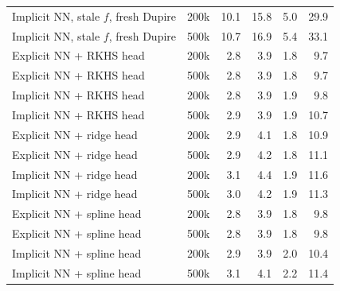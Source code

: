 \begin{tabular}{l l rrrr}
Implicit NN, stale $f$, fresh Dupire & 200k & 10.1 & 15.8 & 5.0 & 29.9\\
Implicit NN, stale $f$, fresh Dupire & 500k & 10.7 & 16.9 & 5.4 & 33.1\\
Explicit NN + RKHS head & 200k & 2.8 & 3.9 & 1.8 & 9.7\\
Explicit NN + RKHS head & 500k & 2.8 & 3.9 & 1.8 & 9.7\\
Implicit NN + RKHS head & 200k & 2.8 & 3.9 & 1.9 & 9.8\\
Implicit NN + RKHS head & 500k & 2.9 & 3.9 & 1.9 & 10.7\\
Explicit NN + ridge head & 200k & 2.9 & 4.1 & 1.8 & 10.9\\
Explicit NN + ridge head & 500k & 2.9 & 4.2 & 1.8 & 11.1\\
Implicit NN + ridge head & 200k & 3.1 & 4.4 & 1.9 & 11.6\\
Implicit NN + ridge head & 500k & 3.0 & 4.2 & 1.9 & 11.3\\
Explicit NN + spline head & 200k & 2.8 & 3.9 & 1.8 & 9.8\\
Explicit NN + spline head & 500k & 2.8 & 3.9 & 1.8 & 9.8\\
Implicit NN + spline head & 200k & 2.9 & 3.9 & 2.0 & 10.4\\
Implicit NN + spline head & 500k & 3.1 & 4.1 & 2.2 & 11.4\\
\bottomrule
\end{tabular}
